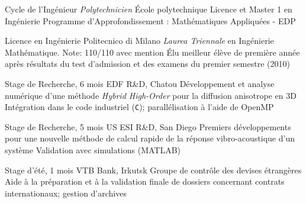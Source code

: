 \documentclass[french]{RMcv}
\begin{document}

%
%
        {Cycle de l'Ing\'enieur \textit{Polytechnicien}}%
        {\'Ecole polytechnique}%
        {Licence et Master 1 en Ing\'enierie}%
        {Programme d'Approfondissement : Math\'ematiques Appliqu\'ees - EDP}


%
%
        {Licence en Ing\'enierie}%
        {Politecnico di Milano}%
        {\emph{Laurea Triennale} en Ing\'enierie Math\'ematique. Note: 110/110 avec mention}%
        {\'Elu meilleur \'el\`eve de premi\`ere ann\'ee apr\`es r\'esultats du test d'admission et des examens du premier semestre (2010)}


%
%
        {Stage de Recherche, 6 mois}%
        {EDF R\&D, Chatou}%
        {D\'eveloppement et analyse num\'erique d'une m\'ethode \emph{Hybrid High-Order} pour la diffusion anisotrope en 3D}%
        {Int\'egration dans le code industriel \cs{} (\texttt{C}); parall\'elisation \`a l'aide de OpenMP}


%
%
        {Stage de Recherche, 5 mois}%
        {US ESI R\&D, San Diego}%
        {Premiers d\'eveloppements pour une nouvelle m\'ethode de calcul rapide de la r\'eponse vibro-acoustique d'un syst\`eme}%
        {Validation avec simulations (MATLAB)}


%
%
        {Stage d'\'et\'e, 1 mois}%
        {VTB Bank, Irkutsk}%
        {Groupe de contr\^ole des devises \'etrang\`eres}%
        {Aide \`a la pr\'eparation et \`a la validation finale de dossiers concernant contrats internationaux; gestion d'archives}
\end{document}

